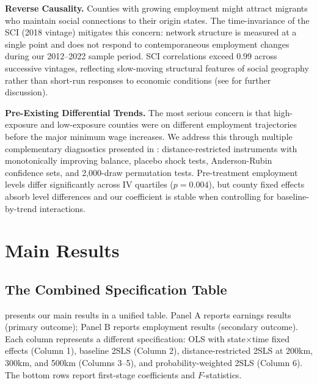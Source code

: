 \documentclass[12pt]{article}
\begin{document}
\textbf{Reverse Causality.} Counties with growing employment might attract migrants who maintain social connections to their origin states. The time-invariance of the SCI (2018 vintage) mitigates this concern: network structure is measured at a single point and does not respond to contemporaneous employment changes during our 2012--2022 sample period. SCI correlations exceed 0.99 across successive vintages, reflecting slow-moving structural features of social geography rather than short-run responses to economic conditions (see  for further discussion).

\textbf{Pre-Existing Differential Trends.} The most serious concern is that high-exposure and low-exposure counties were on different employment trajectories before the major minimum wage increases. We address this through multiple complementary diagnostics presented in : distance-restricted instruments with monotonically improving balance, placebo shock tests, Anderson-Rubin confidence sets, and 2,000-draw permutation tests. Pre-treatment employment levels differ significantly across IV quartiles ($p = 0.004$), but county fixed effects absorb level differences and our coefficient is stable when controlling for baseline-by-trend interactions.


\section{Main Results}
\label{sec:results}

\subsection{The Combined Specification Table}

 presents our main results in a unified table. Panel A reports earnings results (primary outcome); Panel B reports employment results (secondary outcome). Each column represents a different specification: OLS with state$\times$time fixed effects (Column 1), baseline 2SLS (Column 2), distance-restricted 2SLS at 200km, 300km, and 500km (Columns 3--5), and probability-weighted 2SLS (Column 6). The bottom rows report first-stage coefficients and $F$-statistics.
\end{document}
